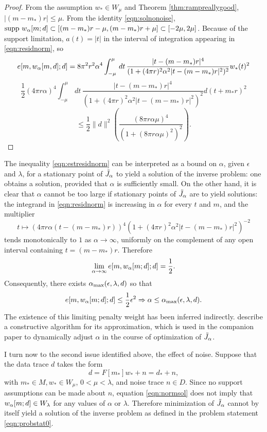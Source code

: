 \begin{proof}
  From the assumption $w_* \in W_{\mu}$ and Theorem
  \ref{thm:rampreallygood}, $|(m-m_*)r|\le \mu$. From the
  identity \ref{eqn:solnonoise},
  $\mbox{supp }w_{\alpha}[m;d] \subset
  [(m-m_*)r-\mu,(m-m_*)r+\mu] \subset
  [-2\mu,2\mu]$. Because of the support limitation, $a(t)=|t|$ in the
  interval of integration appearing in \ref{eqn:residnorm}, so
\[
  e[m,w_{\alpha}[m,d];d] 
= 8 \pi^2 r^2 \alpha^4\int^{\mu}_{-\mu}\,dt\,\frac{|t-(m-m_*)r|^4}{(1+(4\pi r)^2 \alpha^2 
|t-(m-m_*)r|^2)^{2}}w_*(t)^2
\]
\[
  \frac{1}{2} (4\pi r \alpha)^4\int^{\mu}_{-\mu}\,dt\,\frac{|t-(m-m_*)r|^4}{(1+(4\pi r)^2 \alpha^2 
|t-(m-m_*)r|^2)^{2}}d(t+m_*r)^2
\]
\[
  \le \frac{1}{2} \|d\|^2  \left(\frac{(8\pi r \alpha \mu)^4}{(1+(8\pi
      r \alpha \mu)^2)^2}\right).
  \]
\end{proof}

The inequality \ref{eqn:estresidnorm} can be interpreted as a bound 
on $\alpha$, given $\epsilon$ and $\lambda$, for a
stationary point of $\tilde{J}_{\alpha}$ to yield a solution of the inverse
problem: one obtains a solution, provided that $\alpha$ is
sufficiently small. On the other hand, it is clear that $\alpha$
cannot be too large if stationary points of $\tilde{J}_{\alpha}$ are to yield
solutions: the integrand in \ref{eqn:residnorm} is increasing in
$\alpha$ for every $t$ and $m$, and the multiplier
\[
t \mapsto (4\pi r \alpha(t-(m-m_*)r))^4(1+(4\pi r)^2 \alpha^2 
|t-(m-m_*)r|^2)^{-2}
\]
tends monotonically to $1$ as $\alpha \rightarrow \infty$, uniformly
on the complement of any open interval containing
$t=(m-m_*)r$. Therefore
\begin{equation}
  \label{eqn:elimit}
  \lim_{\alpha \rightarrow \infty}e[m,w_{\alpha}[m;d];d] = \frac{1}{2}.
\end{equation}
Consequently, there exists $\alpha_{\rm max}(\epsilon,\lambda,d)$ so
that
\[
  e[m,w_{\alpha}[m;d];d]  \le \frac{1}{2}\epsilon^2
  \Rightarrow \alpha \le \alpha_{\rm max}(\epsilon,\lambda,d).
\]
The existence of this limiting penalty weight has been inferred
indirectly. \cite{FuSymes2017discrepancy} describe a constructive
algorithm for its approximation, which is used in the companion paper
\cite{SymesChenMinkoff:21} to dynamically adjust $\alpha$ in the
course of optimization of $\tilde{J}_{\alpha}$.

I turn now to the second issue identified above, the effect of
noise. Suppose that the data trace $d$ takes the form
\begin{equation}
  \label{eqn:defdatanoisy}
  d = F[m_*]w_* + n = d_*+n,
\end{equation}
with $m_* \in M, w_* \in W_{\mu}$, $0<\mu<\lambda$, and noise trace $n \in
D$. Since no support assumptions can be made about $n$, equation
\ref{eqn:normsol} does not imply that $w_{\alpha}[m;d] \in W_{\lambda}$ for any values of
$\alpha$ or $\lambda$.  Therefore minimization of $\tilde{J}_{\alpha}$ cannot by itself yield a
solution of the inverse problem as defined in the problem statement
\ref{eqn:probstat0}. %

